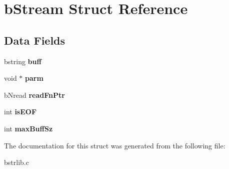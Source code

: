 \hypertarget{structbStream}{}\section{b\+Stream Struct Reference}
\label{structbStream}
\subsection*{Data Fields}
\begin{DoxyCompactItemize}
\item 
\hypertarget{structbStream_aba3294390fa40724b5762adf073c1b86}{}bstring {\bfseries buff}\label{structbStream_aba3294390fa40724b5762adf073c1b86}

\item 
\hypertarget{structbStream_a43b389e3157aea7f84ba553ad7b24e3e}{}void $\ast$ {\bfseries parm}\label{structbStream_a43b389e3157aea7f84ba553ad7b24e3e}

\item 
\hypertarget{structbStream_a4279a6d91f9df1f4f3dc157d18479491}{}b\+Nread {\bfseries read\+Fn\+Ptr}\label{structbStream_a4279a6d91f9df1f4f3dc157d18479491}

\item 
\hypertarget{structbStream_a7d014819731e1d0415ba4ff92e80ffda}{}int {\bfseries is\+E\+O\+F}\label{structbStream_a7d014819731e1d0415ba4ff92e80ffda}

\item 
\hypertarget{structbStream_a952ac9807d96d9d1dc510ed4bdc8b257}{}int {\bfseries max\+Buff\+Sz}\label{structbStream_a952ac9807d96d9d1dc510ed4bdc8b257}

\end{DoxyCompactItemize}


The documentation for this struct was generated from the following file\+:\begin{DoxyCompactItemize}
\item 
bstrlib.\+c\end{DoxyCompactItemize}
